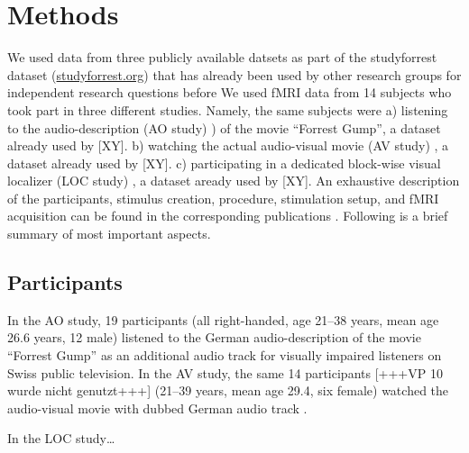 \documentclass[english]{article}
\begin{document}
\section{Methods}
We used data from three publicly available datsets as part of the studyforrest dataset (\href{http://www.studyforrest.org}{studyforrest.org}) that has already been used by other research groups for independent research questions before
We used fMRI data from 14 subjects who took part in three different studies. Namely, the same subjects were
a) listening to the audio-description (AO study) \citep{hanke2014audiomovie}) of the movie ``Forrest Gump'', a dataset already used by [XY].
b) watching the actual audio-visual movie (AV study) \citep{hanke2016simultaneous}, a dataset already used by [XY].
c) participating in a dedicated block-wise visual localizer (LOC study) \citep{sengupta2016extension}, a dataset aready used by [XY].
An exhaustive description of the participants, stimulus creation, procedure, stimulation setup, and fMRI acquisition can be found in the corresponding publications  \citep{hanke2014audiomovie, hanke2016simultaneous, sengupta2016extension}.
Following is a brief summary of most important aspects.


\subsection{Participants}
In the AO study, 19 participants (all right-handed, age 21–38 years, mean age 26.6 years, 12 male) listened to the German audio-description \citep{ForrestGumpGermanAD} of the movie ``Forrest Gump'' \citep{ForrestGumpMovie} as an additional audio track for visually impaired listeners on Swiss public television.
In the AV study, the same 14 participants [+++VP 10 wurde nicht genutzt+++] (21–39 years, mean age 29.4, six female) watched the audio-visual movie with dubbed German audio track \citep{ForrestGumpDVD}.

In the LOC study\dots
\end{document}
